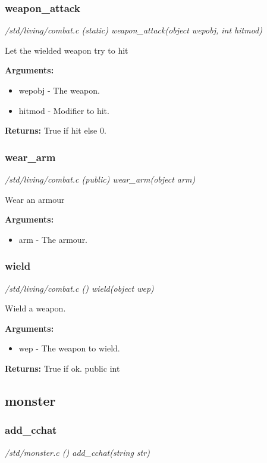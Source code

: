 \subsubsection{weapon\_attack}

{\em /std/living/combat.c (static) weapon\_attack(object wepobj, int hitmod)}

Let the wielded weapon try to hit

{\bf Arguments:}
\begin{itemize}
\item      wepobj - The weapon.
\item hitmod - Modifier to hit.
\end{itemize}

{\bf Returns:}        True if hit else 0.


\subsubsection{wear\_arm}

{\em /std/living/combat.c (public) wear\_arm(object arm)}

Wear an armour

{\bf Arguments:}
\begin{itemize}
\item     arm - The armour.
\end{itemize}


\subsubsection{wield}

{\em /std/living/combat.c () wield(object wep)}

Wield a weapon.

{\bf Arguments:}
\begin{itemize}
\item     wep - The weapon to wield.
\end{itemize}

{\bf Returns:}        True if ok.
public int


\subsection{monster}
\subsubsection{add\_cchat}

{\em /std/monster.c () add\_cchat(string str)}

